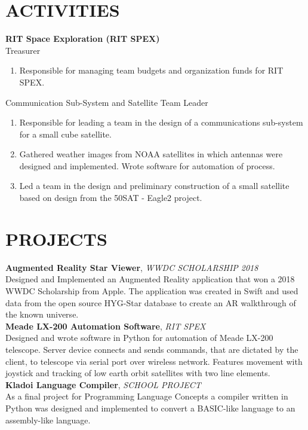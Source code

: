 \documentclass[line, margin]{res}
\begin{document}
\begin{resume}
\section{ACTIVITIES}
\textbf{RIT Space Exploration (RIT SPEX)}\\
Treasurer
      \begin{enumerate}
        \item[] Responsible for managing team budgets and organization funds for RIT SPEX.
      \end{enumerate}
      
Communication Sub-System and  Satellite Team Leader
      \begin{enumerate}
        \item[] Responsible for leading a team in the design of a communications sub-system for a small cube satellite.
        \item[] Gathered weather images from NOAA satellites in which antennas were designed and implemented. Wrote software for automation of process.
        \item[] Led a team in the design and preliminary construction of a small satellite based on design from the \textdollar 50SAT - Eagle2 project.
      \end{enumerate}
      
\section{PROJECTS}
\textbf{Augmented Reality Star Viewer}, \textit{WWDC SCHOLARSHIP 2018}\\
Designed and Implemented an Augmented Reality application that won a 2018 WWDC Scholarship from Apple.  The application was created in Swift and used data from the open source HYG-Star database to create an AR walkthrough of the known universe.
\\ [10pt]
\textbf{Meade LX-200 Automation Software}, \textit{RIT SPEX}\\
Designed and wrote software in Python for automation of Meade LX-200 telescope. Server device connects and sends commands, that are dictated by the client, to telescope via serial port over wireless network. Features movement with joystick and tracking of low earth orbit satellites with two line elements.
\\ [10pt]
\textbf{Kladoi Language Compiler}, \textit{SCHOOL PROJECT}\\
As a final project for Programming Language Concepts a compiler written in Python was designed and implemented to convert a BASIC-like language to an assembly-like language.




\end{resume}
\end{document}

